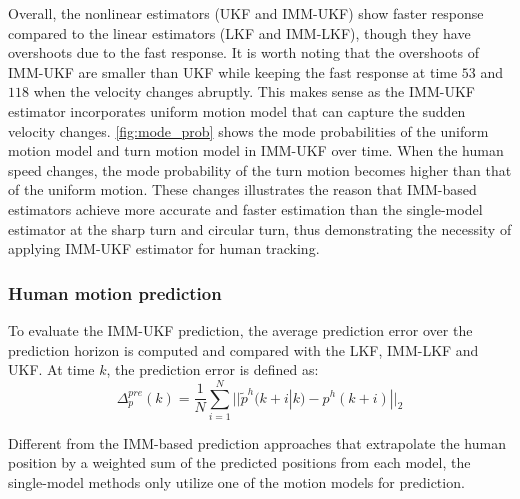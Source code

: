 \documentclass[letterpaper, 10 pt, conference]{ieeeconf}
\begin{document}
	Overall, the nonlinear estimators (UKF and IMM-UKF) show faster response compared to the linear estimators (LKF and IMM-LKF), though they have overshoots due to the fast response. 
	It is worth noting that the overshoots of IMM-UKF are smaller than UKF while keeping the fast response at time $53$ and $118$ when the velocity changes abruptly.    
	This makes sense as the IMM-UKF estimator incorporates uniform motion model that can capture the sudden velocity changes.
	\cref{fig:mode_prob} shows the mode probabilities of the uniform motion model and turn motion model in IMM-UKF over time.
	When the human speed changes, the mode probability of the turn motion becomes higher than that of the uniform motion. 
	These changes illustrates the reason that IMM-based estimators achieve more accurate and faster estimation than the single-model estimator at the sharp turn and circular turn, thus demonstrating the necessity of applying IMM-UKF estimator for human tracking.
	
	\subsubsection{Human motion prediction}\label{subsubsec:motion_pred}
	To evaluate the IMM-UKF prediction, the average prediction error over the prediction horizon is computed and compared with the LKF, IMM-LKF and UKF. 
	At time $k$, the prediction error is defined as:
	\begin{equation}
		\Delta^{pre}_p(k)=\frac{1}{N}\sum\limits_{i=1}^{N}||\tilde{p}^h(k+i|k)-p^h(k+i)||_2\label{eqn:pred_err}
	\end{equation}
	
	Different from the IMM-based prediction approaches that extrapolate the human position by a weighted sum of the predicted positions from each model, the single-model methods only utilize one of the motion models for prediction.
	
\end{document}
